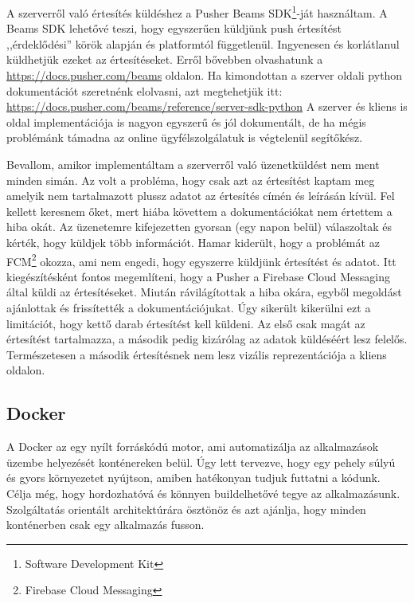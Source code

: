 \documentclass{thesis-ekf}
\theoremstyle{definition}
\theoremstyle{remark}
\begin{document}
A szerverről való értesítés küldéshez a Pusher Beams SDK\footnote{Software Development Kit}-ját használtam.
A Beams SDK lehetővé teszi, hogy egyszerűen küldjünk push értesítést ,,érdeklődési'' körök alapján és platformtól függetlenül.
Ingyenesen és korlátlanul küldhetjük ezeket az értesítéseket. Erről bővebben olvashatunk a \url{https://docs.pusher.com/beams} oldalon.
Ha kimondottan a szerver oldali python  dokumentációt szeretnénk elolvasni, azt megtehetjük itt: \url{https://docs.pusher.com/beams/reference/server-sdk-python}
A szerver és kliens is oldal implementációja is nagyon egyszerű és jól dokumentált, de ha mégis problémánk támadna az online ügyfélszolgálatuk is végtelenül segítőkész.

Bevallom, amikor implementáltam a szerverről való üzenetküldést nem ment minden simán.
Az volt a probléma, hogy csak azt az értesítést kaptam meg amelyik nem tartalmazott plussz adatot az értesítés címén és leírásán kívül.
Fel kellett keresnem őket, mert hiába követtem a dokumentációkat nem értettem a hiba okát.
Az üzenetemre kifejezetten gyorsan (egy napon belül) válaszoltak és kérték, hogy küldjek több információt.
Hamar kiderült, hogy a problémát az FCM\footnote{Firebase Cloud Messaging} okozza, ami nem engedi, hogy egyszerre küldjünk értesítést és adatot.
Itt kiegészítésként fontos megemlíteni, hogy a Pusher a Firebase Cloud Messaging által küldi az értesítéseket.
Miután rávilágítottak a hiba okára, egyből megoldást ajánlottak és frissítették a dokumentációjukat.
Úgy sikerült kikerülni ezt a limitációt, hogy kettő darab értesítést kell küldeni.
Az első csak magát az értesítést tartalmazza, a második pedig kizárólag az adatok küldéséért lesz felelős.
Természetesen a második értesítésnek nem lesz vizális reprezentációja a kliens oldalon.


\subsection{Docker}\label{docker}

A Docker az egy nyílt forráskódú motor, ami automatizálja az alkalmazások üzembe helyezését konténereken belül.
Úgy lett tervezve, hogy egy pehely súlyú és gyors környezetet nyújtson, amiben hatékonyan tudjuk futtatni a kódunk.
Célja még, hogy hordozhatóvá és könnyen buildelhetővé tegye az alkalmazásunk.
Szolgáltatás orientált architektúrára ösztönöz és azt ajánlja, hogy minden konténerben csak egy alkalmazás fusson.\cite{docker}
\end{document}
